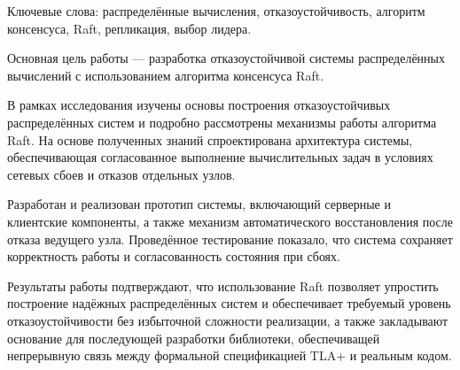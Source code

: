 \abstract %

Ключевые слова: распределённые вычисления, отказоустойчивость, алгоритм
консенсуса, Raft, репликация, выбор лидера.

Основная цель работы — разработка отказоустойчивой системы распределённых
вычислений с использованием алгоритма консенсуса Raft.

В рамках исследования изучены основы построения отказоустойчивых распределённых
систем и подробно рассмотрены механизмы работы алгоритма Raft. На основе
полученных знаний спроектирована архитектура системы, обеспечивающая
согласованное выполнение вычислительных задач в условиях сетевых сбоев и
отказов отдельных узлов.

Разработан и реализован прототип системы, включающий серверные и клиентские
компоненты, а также механизм автоматического восстановления после отказа
ведущего узла. Проведённое тестирование показало, что система сохраняет
корректность работы и согласованность состояния при сбоях.

Результаты работы подтверждают, что использование Raft позволяет упростить
построение надёжных распределённых систем и обеспечивает требуемый уровень
отказоустойчивости без избыточной сложности реализации, а также закладывают
основание для последующей разработки библиотеки, обеспечиващей непрерывную
связь между формальной спецификацией TLA+ и реальным кодом.
